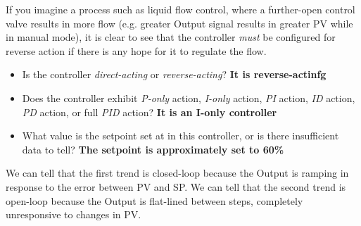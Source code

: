 If you imagine a process such as liquid flow control, where a further-open control valve results in more flow (e.g. greater Output signal results in greater PV while in manual mode), it is clear to see that the controller {\it must} be configured for reverse action if there is any hope for it to regulate the flow.









\begin{itemize}
\item{} Is the controller {\it direct-acting} or {\it reverse-acting}?  {\bf It is reverse-actinfg}
\item{} Does the controller exhibit {\it P-only} action, {\it I-only} action, {\it PI} action, {\it ID} action, {\it PD} action, or full {\it PID} action? {\bf It is an I-only controller}
\item{} What value is the setpoint set at in this controller, or is there insufficient data to tell? {\bf The setpoint is approximately set to 60\%}
\end{itemize}

\vskip 10pt

We can tell that the first trend is closed-loop because the Output is ramping in response to the error between PV and SP.  We can tell that the second trend is open-loop because the Output is flat-lined between steps, completely unresponsive to changes in PV.





